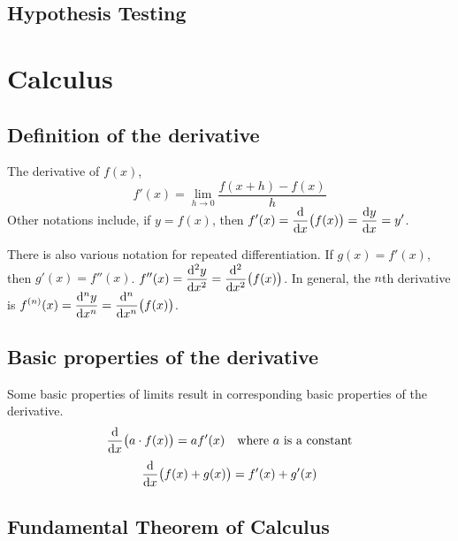 \documentclass[fleqn,a4paper,11pt]{article}
\begin{document}
    \subsection{Hypothesis Testing}


    \section{Calculus}


    \subsection{Definition of the derivative}

    The derivative of \(f(x)\),
    \begin{equation}
    f'(x) = \lim_{h \to 0} \frac{f(x + h) - f(x)}{h}
    \end{equation}
    Other notations include, if \(y = f(x)\), then
    \(\displaystyle f'(x) = \dv{x}(f(x)) = \dv{y}{x} = y'\).

    There is also various notation for repeated differentiation. If
    \(g(x) = f'(x)\), then \(g'(x) = f''(x)\).
    \(\displaystyle f''(x) = \dv[2]{y}{x} = \dv[2]{x}(f(x))\). In general, the
    \(n\)th derivative is
    \(\displaystyle f^{(n)}(x) = \dv[n]{y}{x} = \dv[n]{x}(f(x))\).

    \subsection{Basic properties of the derivative}
    \label{sec_calc_derivative_properties}

    Some basic properties of limits result in corresponding basic properties of
    the derivative.
    \begin{equation*}
    \dv{x}(a \cdot f(x)) = af'(x) \quad \text{where \(a\) is a constant}
    \end{equation*}
    \begin{equation*}
    \dv{x}(f(x) + g(x)) = f'(x) + g'(x)
    \end{equation*}

    \subsection{Fundamental Theorem of Calculus} \label{sec_calc_FTC}
\end{document}
